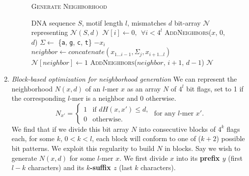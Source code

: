 \documentclass{acm_proc_article-sp}
\begin{document}
\begin{enumerate}
			\begin{figure}[h]
			\noindent \hspace*{6pt}{\bf Algorithm 2} \textsc{Generate Neighborhood}
			\begin{algorithmic}[1]
				\label{alg:recursive-nbr-gen}
				\Require DNA sequence $S$, motif length $l$, mismatches $d$
				\Ensure bit-array $\mathcal{N}$ representing $\mathcal{N}(S,d)$ \vspace*{6pt}
				\State $\mathcal{N}[i] \leftarrow 0,\ \ \forall i < 4^{l}$ 
				\State \textsc{AddNeighbors}($x$, 0, $d$) \hspace*{9pt}
				\EndFor
				\State {}
						\State $\Sigma \leftarrow$ \{\texttt{a}, \texttt{g}, \texttt{c}, \texttt{t}\} $- x_{i}$ \hspace*{6pt}
							\State $neighbor \leftarrow concatenate(x_{1...i-1},\Sigma_{j},x_{i+1...l})$
							\State $\mathcal{N}[neighbor] \leftarrow 1$
								\State \textsc{AddNeighbors}($neighbor$, $i+1$, $d-1$)
							\EndIf
						\EndFor
					\EndFor
				\EndProcedure
				\State\Return $\mathcal{N}$
				\end{algorithmic}
			\end{figure}
		\newpage
		\item{\em Block-based optimization for neighborhood generation}\newline
			We can represent the neighborhood $N(x,d)$ of an $l$-mer $x$ as an array $N$ of $4^{l}$ bit flags, set to 1 if the corresponding $l$-mer is a neighbor and 0 otherwise.
			\begin{equation*}
				N_{x'} = \left\{
				\begin{array}{rl}
					1 & \text{if } dH(x,x') \leq d,\\
					0 & \text{otherwise.}%
				\end{array} \right.
				\text{ for any $l$-mer }x'.
				\end{equation*}
			We find that if we divide this bit array $N$ into consecutive blocks of $4^{k}$ flags each, for some $k$, $0 < k < l$, each block will conform to one of ($k + 2$) possible bit patterns. We exploit this regularity to build $N$ in blocks.
			Say we wish to generate $N(x,d)$ for some $l$-mer $x$. We first divide $x$ into its {\boldmath\bf prefix $y$} (first $l-k$ characters) and its {\boldmath\bf $k$-suffix $z$} (last $k$ characters).\newline\newline	

\end{enumerate}
\end{document}
